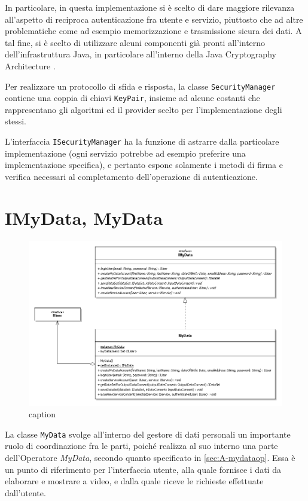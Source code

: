 In particolare, in questa implementazione si \`e scelto di dare maggiore rilevanza all'aspetto di reciproca autenticazione fra utente e servizio, piuttosto che ad altre problematiche come ad esempio memorizzazione e trasmissione sicura dei dati. A tal fine, si \`e scelto di utilizzare alcuni componenti gi\`a pronti all'interno dell'infrastruttura Java, in particolare all'interno della Java Cryptography Architecture \cite{javacrypto}.

Per realizzare un protocollo di sfida e risposta, la classe \texttt{SecurityManager} contiene una coppia di chiavi \texttt{KeyPair}, insieme ad alcune costanti che rappresentano gli algoritmi ed il provider scelto per l'implementazione degli stessi.

L'interfaccia \texttt{ISecurityManager} ha la funzione di astrarre dalla particolare implementazione (ogni servizio potrebbe ad esempio preferire una implementazione specifica), e pertanto espone solamente i metodi di firma e verifica necessari al completamento dell'operazione di autenticazione.

\section{IMyData, MyData}
\begin{figure} [h]
	\includegraphics[width=\linewidth]{pictures/MyData.png}
	\caption{caption}
	\label{fig:Accounting-MyData}
\end{figure}
La classe \texttt{MyData} svolge all’interno del gestore di dati personali un importante ruolo di coordinazione fra le parti, poich\'e realizza al suo interno una parte dell’Operatore \textit{MyData}, secondo quanto specificato in \ref{sec:A-mydataop}. Essa \`e un punto di riferimento per l’interfaccia utente, alla quale fornisce i dati da elaborare e mostrare a video, e dalla quale riceve le richieste effettuate dall’utente.

